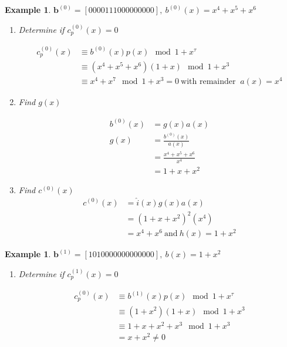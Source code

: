 \documentclass[fontsize=12pt]{article}
\newtheorem{example}[theorem]{Example}
\begin{document}
\begin{example}
\label{ex1}
$\textbf{b}^{(0)}=[ 0 0 0 0 1 1 1 0 0 0 0 0 0 0 0 0],~b^{(0)}(x)=x^4+x^5+x^6$

\begin{enumerate}
\item Determine if $c_p^{(0)}(x) =0$

\begin{equation*}
\begin{split}
c_p^{(0)}(x)& \equiv b^{(0)}(x)p(x) \mod{1+x^{\tau}}\\
& \equiv (x^4+x^5+x^6)(1+x)  \mod{1+x^{3}}\\
&\equiv x^4+x^7  \mod{1+x^{3}} =0 ~\text{with remainder }~ a(x) =x^4
\end{split}
\end{equation*}

\item Find $g(x)$
 
 \begin{equation*}
 \begin{split}
 b^{(0)}(x)&=g(x)a(x) \\
 g(x) &=\frac{b^{(0)}(x)}{a(x)}\\
 &=\frac{x^4+x^5+x^6}{x^4}\\
 &=1+x+x^2
 \end{split}
 \end{equation*}
 
 \item Find $c^{(0)}(x)$
 \begin{equation*}
 \begin{split}
 c^{(0)}(x)&=\hat{i}(x)g(x)a(x) \\
 &=(1+x+x^2)^2(x^4)\\
 &=x^4+x^6 ~\text{and}~ h(x)=1+x^2 
 \end{split}
 \end{equation*}
 
\end{enumerate}
\end{example}

\begin{example}
\label{ex2}
$\textbf{b}^{(1)}=[ 1 0 1 0 0 0 0 0 0 0 0 0 0 0 0 0 ],~ b(x)=1+x^2$

\begin{enumerate}
\item Determine if $c_p^{(1)}(x) =0$

\begin{equation*}
\begin{split}
c_p^{(0)}(x)& \equiv b^{(1)}(x)p(x) \mod{1+x^{\tau}}\\
& \equiv (1+x^2)(1+x)  \mod{1+x^{3}}\\
&\equiv 1+x+x^2+x^3  \mod{1+x^{3}}\\ &=x+x^2 \neq 0
\end{split}
\end{equation*}
\end{enumerate}
\end{example}
 
\end{document}

